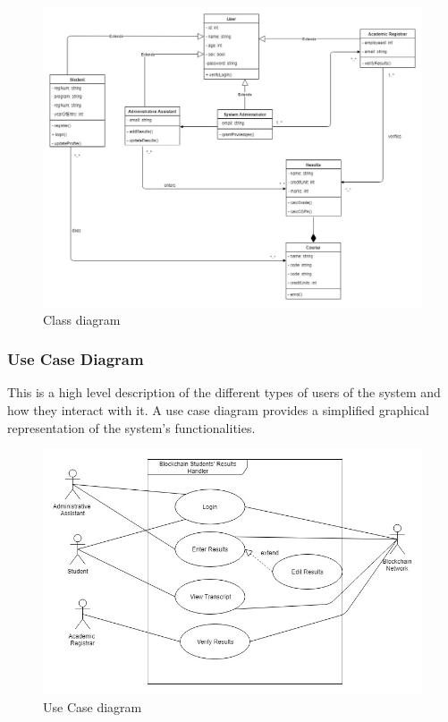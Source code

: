 \begin{figure}[!h]

\includegraphics[scale=0.4]{images/class.jpg}
\caption{Class diagram}
\end{figure}


\subsubsection{Use Case Diagram}
This is a high level description of the different types of users of the system and how they interact with it. A use case diagram provides a simplified graphical representation of the system’s functionalities.

\begin{figure}[!h]
\includegraphics[scale=0.5]{images/Usecase.jpg}
\caption{Use Case diagram}
\end{figure}

